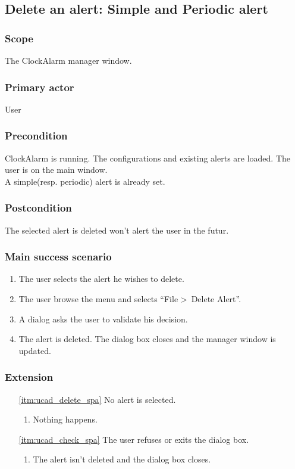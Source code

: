 \subsection{Delete an alert: Simple and Periodic alert}

\subsubsection{Scope}
The ClockAlarm manager window.
\subsubsection{Primary actor}
User
\subsubsection{Precondition}
ClockAlarm is running. The configurations and existing alerts are loaded. The user is on the main window.
\\A simple(resp. periodic) alert is already set.
\subsubsection{Postcondition}
The selected alert is deleted won't alert the user in the futur.
\subsubsection{Main success scenario}
\begin{enumerate}
	\item The user selects the alert he wishes to delete.
	\item \label{itm:ucad_delete_spa} The user browse the menu and selects ``File \textgreater~Delete Alert''.
	\item \label{itm:ucad_check_spa} A dialog asks the user to validate his decision.
	\item The alert is deleted. The dialog box closes and the manager window is updated.
\end{enumerate}
\subsubsection{Extension}
\begin{enumerate}
	\item[\ref{itm:ucad_delete_spa}] No alert is selected.
	\begin{enumerate}[i]
		\item Nothing happens.
	\end{enumerate}
	
	\item[\ref{itm:ucad_check_spa}] The user refuses or exits the dialog box.
	\begin{enumerate}[i]
		\item The alert isn't deleted and the dialog box closes.
	\end{enumerate}
\end{enumerate}

